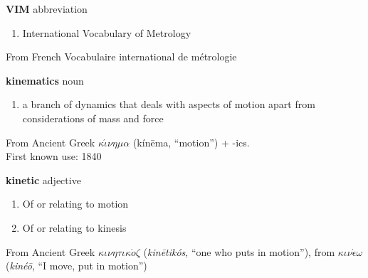 \documentclass[
    DIV=12,
    BCOR=0mm,
    pagenumber=off,
    paper=11in:8.5in,
    pagesize,
]{scrartcl}
\begin{document}
\hfill\vfill
\begin{minipage}{\linewidth}
    \textbf{VIM}
     abbreviation
    \begin{enumerate}
        \item International Vocabulary of Metrology
    \end{enumerate}
    From French Vocabulaire international de m\'{e}trologie 
\end{minipage}
\vfill
\newpage


\hfill\vfill
\begin{minipage}{\linewidth}
    \textbf{kinematics}
     noun
    \begin{enumerate}
        \item a branch of dynamics that deals with aspects of motion
            apart from considerations of mass and force
    \end{enumerate}
    From Ancient Greek $\kappa\acute{\iota}\nu\eta\mu\alpha$ (k\'{i}n\={e}ma, ``motion'') + -ics. \\
    \noindent First known use: 1840
\end{minipage}
\vfill
\newpage


\hfill\vfill
\begin{minipage}{\linewidth}
    \textbf{kinetic}
     adjective
    \begin{enumerate}
        \item Of or relating to motion
        \item Of or relating to kinesis
    \end{enumerate}
    From Ancient Greek $\kappa\iota\nu\eta\tau\iota\kappa\acute{o}\zeta$
        (\emph{kin\={e}tik\'{o}s}, ``one who puts in motion''),
        from $\kappa\iota\nu\acute{\epsilon}\omega$
        (\emph{kin\'{e}\={o}}, ``I move, put in motion'')
\end{minipage}
\vfill
\newpage
\end{document}
